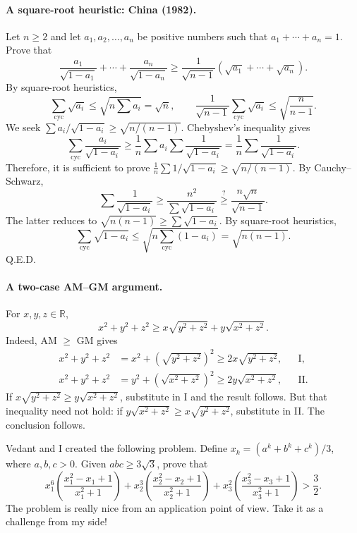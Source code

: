 \documentclass[11pt,a4paper]{article}
\begin{document}

\paragraph{A square-root heuristic: China (1982).}
Let $n\geq2$ and let $a_1,a_2,\ldots,a_n$ be positive numbers such that $a_1+\cdots+a_n=1$.
Prove that
\[\frac{a_1}{\sqrt{1-a_1}}+\cdots+\frac{a_n}{\sqrt{1-a_n}}
\geq\frac1{\sqrt{n-1}}(\sqrt{a_1}+\cdots+\sqrt{a_n}).\]
By square-root heuristics,
\[\sum_{\mathrm{cyc}}\sqrt{a_i}\leq\sqrt{n\sum a_i}=\sqrt n,
\qquad\frac1{\sqrt{n-1}}\sum_{\mathrm{cyc}}\sqrt{a_i}\leq\sqrt{\frac n{n-1}}.\]
We seek $\sum a_i/\sqrt{1-a_i}\geq\sqrt{n/(n-1)}$.
Chebyshev's inequality gives
\[\sum_{\mathrm{cyc}}\frac{a_i}{\sqrt{1-a_i}}
\geq\frac1n\sum a_i\sum\frac1{\sqrt{1-a_i}}
=\frac1n\sum\frac1{\sqrt{1-a_i}}.\]
Therefore, it is sufficient to prove
$\frac1n\sum1/\sqrt{1-a_i}\geq\sqrt{n/(n-1)}$.
By Cauchy--Schwarz,
\[\sum\frac1{\sqrt{1-a_i}}\geq\frac{n^2}{\sum\sqrt{1-a_i}}
\mathrel{\stackrel{?}{\geq}}\frac{n\sqrt n}{\sqrt{n-1}}.\]
The latter reduces to $\sqrt{n(n-1)}\geq\sum\sqrt{1-a_i}$.
By square-root heuristics,
\[\sum_{\mathrm{cyc}}\sqrt{1-a_i}\leq\sqrt{n\sum_{\mathrm{cyc}}(1-a_i)}=\sqrt{n(n-1)}.\]
Q.E.D.
\paragraph{A two-case AM--GM argument.}
For $x,y,z\in\mathbb R$,
\[x^2+y^2+z^2\geq x\sqrt{y^2+z^2}+y\sqrt{x^2+z^2}.\]
Indeed, AM $\geq$ GM gives
\[
\begin{aligned}
x^2+y^2+z^2&=x^2+\left(\sqrt{y^2+z^2}\right)^2
\geq2x\sqrt{y^2+z^2}, &&\text{I},\\
x^2+y^2+z^2&=y^2+\left(\sqrt{x^2+z^2}\right)^2
\geq2y\sqrt{x^2+z^2}, &&\text{II}.
\end{aligned}
\]
If $x\sqrt{y^2+z^2}\geq y\sqrt{x^2+z^2}$, substitute in I and the result follows.
But that inequality need not hold: if $y\sqrt{x^2+z^2}\geq x\sqrt{y^2+z^2}$, substitute in II\@.
The conclusion follows.

Vedant and I created the following problem.
Define $x_k=(a^k+b^k+c^k)/3$, where $a,b,c>0$.
Given $abc\geq3\sqrt3$, prove that
\[
x_1^6\left(\frac{x_1^2-x_1+1}{x_1^2+1}\right)
+x_2^3\left(\frac{x_2^2-x_2+1}{x_2^2+1}\right)
+x_3^2\left(\frac{x_3^2-x_3+1}{x_3^2+1}\right)>\frac32.
\]
The problem is really nice from an application point of view. Take it as
a challenge from my side!
\end{document}
